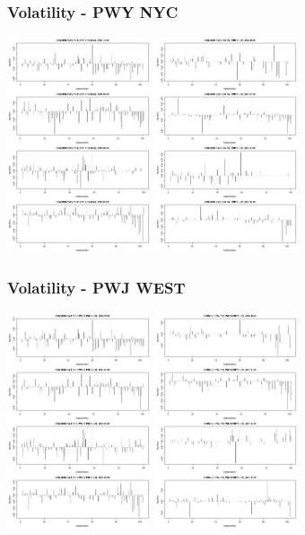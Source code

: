 \documentclass[10pt]{beamer}
\begin{document}
\frame
{
  \frametitle{Volatility - PWY NYC}

\begin{center}
  \includegraphics[height=2.5in]{figures/pwy-peak-vol.png}
  \includegraphics[height=2.5in]{figures/pwy-offpeak-vol.png}
\end{center}

}

\frame
{
  \frametitle{Volatility - PWJ WEST}

\begin{center}
  \includegraphics[height=2.5in]{figures/pwj-peak-vol.png}
  \includegraphics[height=2.5in]{figures/pwj-offpeak-vol.png}
\end{center}
}
\end{document}
